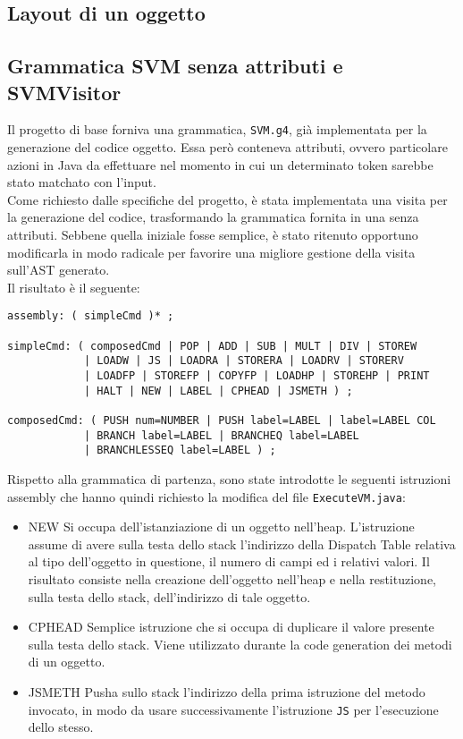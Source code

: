 \documentclass[a4paper]{article}   %
\begin{document}
\subsection{Layout di un oggetto}
\subsection{Grammatica SVM senza attributi e SVMVisitor}
Il progetto di base forniva una grammatica, \lstinline|SVM.g4|, già implementata per la generazione del codice oggetto. Essa però conteneva attributi, ovvero particolare azioni in Java da effettuare nel momento in cui un determinato token sarebbe stato matchato con l'input.\\
Come richiesto dalle specifiche del progetto, è stata implementata una visita per la generazione del codice, trasformando la grammatica fornita in una senza attributi. Sebbene quella iniziale fosse semplice, è stato ritenuto opportuno modificarla in modo radicale per favorire una migliore gestione della visita sull'AST generato.\\
Il risultato è il seguente:
\begin{lstlisting}[language=ANTLR,basicstyle=\footnotesize\ttfamily]
assembly: ( simpleCmd )* ;

simpleCmd: ( composedCmd | POP | ADD | SUB | MULT | DIV | STOREW
			| LOADW | JS | LOADRA | STORERA | LOADRV | STORERV
			| LOADFP | STOREFP | COPYFP | LOADHP | STOREHP | PRINT
			| HALT | NEW | LABEL | CPHEAD | JSMETH ) ;

composedCmd: ( PUSH num=NUMBER | PUSH label=LABEL | label=LABEL COL
            | BRANCH label=LABEL | BRANCHEQ label=LABEL
            | BRANCHLESSEQ label=LABEL ) ;
\end{lstlisting}
Rispetto alla grammatica di partenza, sono state introdotte le seguenti istruzioni assembly che hanno quindi richiesto la modifica del file \lstinline|ExecuteVM.java|:
\begin{itemize}
\item NEW\newline
Si occupa dell'istanziazione di un oggetto nell'heap. L'istruzione assume di avere sulla testa dello stack l'indirizzo della Dispatch Table relativa al tipo dell'oggetto in questione, il numero di campi ed i relativi valori. Il risultato consiste nella creazione dell'oggetto nell'heap e nella restituzione, sulla testa dello stack, dell'indirizzo di tale oggetto.
\item CPHEAD\newline
Semplice istruzione che si occupa di duplicare il valore presente sulla testa dello stack. Viene utilizzato durante la code generation dei metodi di un oggetto.
\item JSMETH\newline
Pusha sullo stack l'indirizzo della prima istruzione del metodo invocato, in modo da usare successivamente l'istruzione \lstinline|JS| per l'esecuzione dello stesso.\\\\
\end{itemize}
\end{document}
